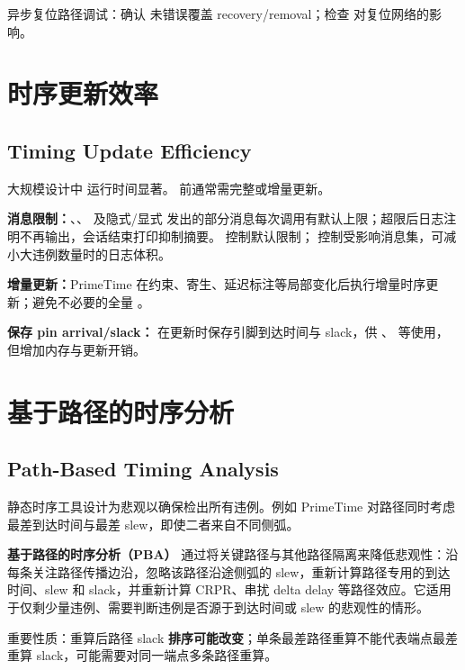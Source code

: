 异步复位路径调试：确认  未错误覆盖 recovery/removal；检查  对复位网络的影响。

\section{时序更新效率}
\subsection*{Timing Update Efficiency}

大规模设计中  运行时间显著。 前通常需完整或增量更新。

\textbf{消息限制：}、、 及隐式/显式  发出的部分消息每次调用有默认上限；超限后日志注明不再输出，会话结束打印抑制摘要。 控制默认限制； 控制受影响消息集，可减小大违例数量时的日志体积。

\textbf{增量更新：}PrimeTime 在约束、寄生、延迟标注等局部变化后执行增量时序更新；避免不必要的全量 。

\textbf{保存 pin arrival/slack：} 在更新时保存引脚到达时间与 slack，供 、 等使用，但增加内存与更新开销。

\section{基于路径的时序分析}
\subsection*{Path-Based Timing Analysis}

静态时序工具设计为悲观以确保检出所有违例。例如 PrimeTime 对路径同时考虑最差到达时间与最差 slew，即使二者来自不同侧弧。

\textbf{基于路径的时序分析（PBA）} 通过将关键路径与其他路径隔离来降低悲观性：沿每条关注路径传播边沿，忽略该路径沿途侧弧的 slew，重新计算路径专用的到达时间、slew 和 slack，并重新计算 CRPR、串扰 delta delay 等路径效应。它适用于仅剩少量违例、需要判断违例是否源于到达时间或 slew 的悲观性的情形。

重要性质：重算后路径 slack \textbf{排序可能改变}；单条最差路径重算不能代表端点最差重算 slack，可能需要对同一端点多条路径重算。

